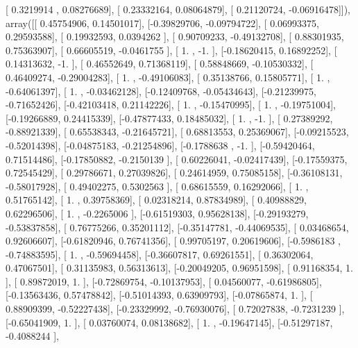 \documentclass{article}
\begin{document}
       [ 0.3219914 ,  0.08276689],
       [ 0.23332164,  0.08064879],
       [ 0.21120724, -0.06916478]]), array([[ 0.45754906,  0.14501017],
       [-0.39829706, -0.09794722],
       [ 0.06993375,  0.29593588],
       [ 0.19932593,  0.0394262 ],
       [ 0.90709233, -0.49132708],
       [ 0.88301935,  0.75363907],
       [ 0.66605519, -0.0461755 ],
       [ 1.        , -1.        ],
       [-0.18620415,  0.16892252],
       [ 0.14313632, -1.        ],
       [ 0.46552649,  0.71368119],
       [ 0.58848669, -0.10530332],
       [ 0.46409274, -0.29004283],
       [ 1.        , -0.49106083],
       [ 0.35138766,  0.15805771],
       [ 1.        , -0.64061397],
       [ 1.        , -0.03462128],
       [-0.12409768, -0.05434643],
       [-0.21239975, -0.71652426],
       [-0.42103418,  0.21142226],
       [ 1.        , -0.15470995],
       [ 1.        , -0.19751004],
       [-0.19266889,  0.24415339],
       [-0.47877433,  0.18485032],
       [ 1.        , -1.        ],
       [ 0.27389292, -0.88921339],
       [ 0.65538343, -0.21645721],
       [ 0.68813553,  0.25369067],
       [-0.09215523, -0.52014398],
       [-0.04875183, -0.21254896],
       [-0.1788638 , -1.        ],
       [-0.59420464,  0.71514486],
       [-0.17850882, -0.2150139 ],
       [ 0.60226041, -0.02417439],
       [-0.17559375,  0.72545429],
       [ 0.29786671,  0.27039826],
       [ 0.24614959,  0.75085158],
       [-0.36108131, -0.58017928],
       [ 0.49402275,  0.5302563 ],
       [ 0.68615559,  0.16292066],
       [ 1.        ,  0.51765142],
       [ 1.        ,  0.39758369],
       [ 0.02318214,  0.87834989],
       [ 0.40988829,  0.62296506],
       [ 1.        , -0.2265006 ],
       [-0.61519303,  0.95628138],
       [-0.29193279, -0.53837858],
       [ 0.76775266,  0.35201112],
       [-0.35147781, -0.44069535],
       [ 0.03468654,  0.92606607],
       [-0.61820946,  0.76741356],
       [ 0.99705197,  0.20619606],
       [-0.5986183 , -0.74883595],
       [ 1.        , -0.59694458],
       [-0.36607817,  0.69261551],
       [ 0.36302064,  0.47067501],
       [ 0.31135983,  0.56313613],
       [-0.20049205,  0.96951598],
       [ 0.91168354,  1.        ],
       [ 0.89872019,  1.        ],
       [-0.72869754, -0.10137953],
       [ 0.04560077, -0.61986805],
       [-0.13563436,  0.57478842],
       [-0.51014393,  0.63909793],
       [-0.07865874,  1.        ],
       [ 0.88909399, -0.52227438],
       [-0.23329992, -0.76930076],
       [ 0.72027838, -0.7231239 ],
       [-0.65041909,  1.        ],
       [ 0.03760074,  0.08138682],
       [ 1.        , -0.19647145],
       [-0.51297187, -0.4088244 ],
\end{document}
